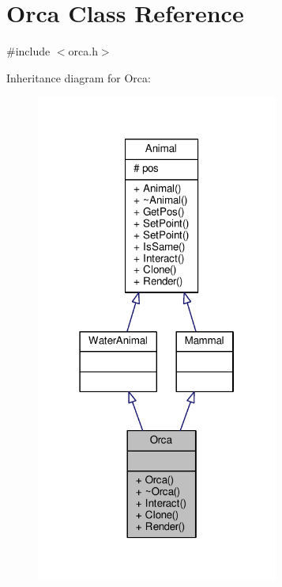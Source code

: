 \hypertarget{classOrca}{}\section{Orca Class Reference}
\label{classOrca}


{\ttfamily \#include $<$orca.\+h$>$}



Inheritance diagram for Orca\+:
\nopagebreak
\begin{figure}[H]
\begin{center}
\leavevmode
\includegraphics[width=226pt]{classOrca__inherit__graph}
\end{center}
\end{figure}


